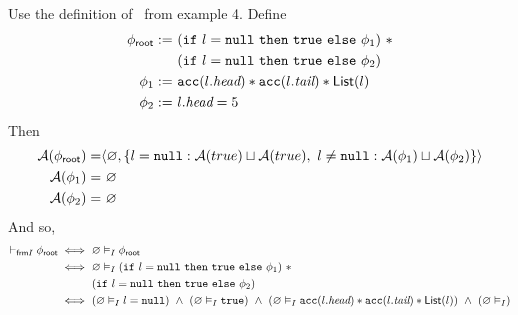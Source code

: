 Use the definition of \List \ from example 4. Define
\begin{align*}
{\phi_\textsf{root}} := & \
(\texttt{if} \ l = \texttt{null} \
  \texttt{then} \ \texttt{true} \
  \texttt{else} \ \phi_1)
\ \ast \\ & \
(\texttt{if} \ l = \texttt{null} \
  \texttt{then} \ \texttt{true} \
  \texttt{else} \ \phi_2)
\\
\phi_1 := & \ \texttt{acc}(l.\textit{head}) \ast \texttt{acc}(l.\textit{tail}) \ast \textsf{List}(l)
\\
\phi_2 := & \ l.\textit{head} = 5
\end{align*}
Then
\begin{align*}
\mathcal{A}({\phi_\textsf{root}}) = &
  \langle  \varnothing ,  \left\{ 
      l = \texttt{null}: \mathcal{A}(true) \sqcup \mathcal{A}(true), \
      l \neq \texttt{null}: \mathcal{A}(\phi_1) \sqcup \mathcal{A}(\phi_2)
     \right\}  \rangle
\\
\mathcal{A}(\phi_1) = & \
  \varnothing
\\
\mathcal{A}(\phi_2) = & \
  \varnothing
\end{align*}
And so,
\begin{align*}
\selfframing \phiroot
\iff & \
\empty \frames \phiroot
\\ \iff & \
\empty \frames
(\cif \ l = \cnull \ \cthen \ \ctrue \ \celse \ \phi_1) \ \ast \\ & \
(\cif \ l = \cnull \ \cthen \ \ctrue \ \celse \ \phi_2)
\\ \iff & \
( \empty \frames l = \cnull ) \ \land \
( \empty \frames \ctrue ) \ \land \
( \empty \frames \cacc(l.\vhead) \ast \cacc(l.\vtail) \ast \List(l) ) \ \land \
( \empty \frames )
%
\end{align*}


%
